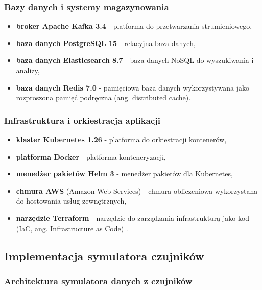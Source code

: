 \subsubsection{Bazy danych i systemy magazynowania}
\label{subsubsec:bazy_danych}

\begin{itemize}
    \item \textbf{broker Apache Kafka 3.4} \cite{kafka} - platforma do przetwarzania strumieniowego,
    \item \textbf{baza danych PostgreSQL 15} - relacyjna baza danych,
    \item \textbf{baza danych Elasticsearch 8.7} - baza danych NoSQL \cite{nosql_definition} do wyszukiwania i analizy,
    \item \textbf{baza danych Redis 7.0} - pamięciowa baza danych wykorzystywana jako rozproszona pamięć podręczna (ang. distributed cache).
\end{itemize}

\subsubsection{Infrastruktura i orkiestracja aplikacji}
\label{subsubsec:infrastruktura}

\begin{itemize}
    \item \textbf{klaster Kubernetes 1.26} \cite{kubernetes} - platforma do orkiestracji kontenerów,
    \item \textbf{platforma Docker} - platforma konteneryzacji,
    \item \textbf{menedżer pakietów Helm 3} - menedżer pakietów dla Kubernetes,
    \item \textbf{chmura AWS} (Amazon Web Services) \cite{aws_definition} - chmura obliczeniowa wykorzystana do hostowania usług zewnętrznych,
    \item \textbf{narzędzie Terraform} - narzędzie do zarządzania infrastrukturą jako kod (IaC, ang. Infrastructure as Code) \cite{terraform_docs}.
\end{itemize}

\subsection{Implementacja symulatora czujników}
\label{subsec:implementacja_symulatora}

\subsubsection{Architektura symulatora danych z czujników}
\label{subsubsec:architektura_symulatora}

